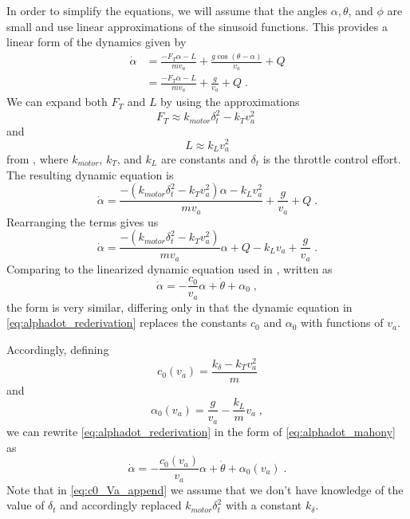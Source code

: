 In order to simplify the equations, we will assume that the angles $\alpha, \theta$, and $\phi$ are small and use linear approximations of the sinusoid functions. This provides a linear form of the dynamics given by
\begin{align}
\dot{\alpha} &= \frac{-F_T\alpha - L}{mv_a} + \frac{g\cos(\theta - \alpha)}{v_a} + Q \\
			 &= \frac{-F_T\alpha - L}{mv_a} + \frac{g}{v_a} + Q \;.
\end{align}
We can expand both $F_T$ and $L$ by using the approximations
\begin{equation}
F_T \approx k_{motor}\delta_t^2 - k_T v_a^2 \;
\end{equation}
and
\begin{equation}
L \approx k_L v_a^2
\end{equation}
from \cite{BeardMcLain12},
where $k_{motor}$, $k_T$, and $k_L$ are constants and $\delta_t$ is the throttle control effort.
The resulting dynamic equation is
\begin{equation}
\dot{\alpha} = \frac{-(k_{motor}\delta_t^2 - k_T v_a^2)\alpha - k_L v_a^2}{mv_a} + \frac{g}{v_a} + Q \;.
\end{equation}
Rearranging the terms gives us
\begin{equation} \label{eq:alphadot_rederivation}
\dot{\alpha} = \frac{-(k_{motor}\delta_t^2 - k_T v_a^2)}{mv_a}\alpha + Q - k_L v_a + \frac{g}{v_a} \;.
\end{equation}
Comparing to the linearized dynamic equation used in \cite{Mahony11}, written as
\begin{equation} \label{eq:alphadot_mahony}
\dot{\alpha} = -\frac{c_0}{v_a}\alpha + \dot{\theta} + \alpha_0 \;,
\end{equation}
the form is very similar, differing only in that the dynamic equation in \eqref{eq:alphadot_rederivation} replaces the constants $c_0$ and $\alpha_0$ with functions of $v_a$.

Accordingly, defining
\begin{equation} \label{eq:c0_Va_append}
c_0(v_a) = \frac{k_\delta - k_T v_a^2}{m}
\end{equation}
and
\begin{equation}
\alpha_0(v_a) = \frac{g}{v_a} - \frac{k_L}{m}v_a \;,
\end{equation}
we can rewrite \eqref{eq:alphadot_rederivation} in the form of \eqref{eq:alphadot_mahony} as
\begin{equation} \label{eq:alphadot_final}
\dot{\alpha} = -\frac{c_0(v_a)}{v_a}\alpha + \dot{\theta} + \alpha_0(v_a) \;.
\end{equation}
Note that in \eqref{eq:c0_Va_append} we assume that we don't have knowledge of the value of $\delta_t$ and accordingly replaced $k_{motor}\delta_t^2$ with a constant $k_\delta$.

